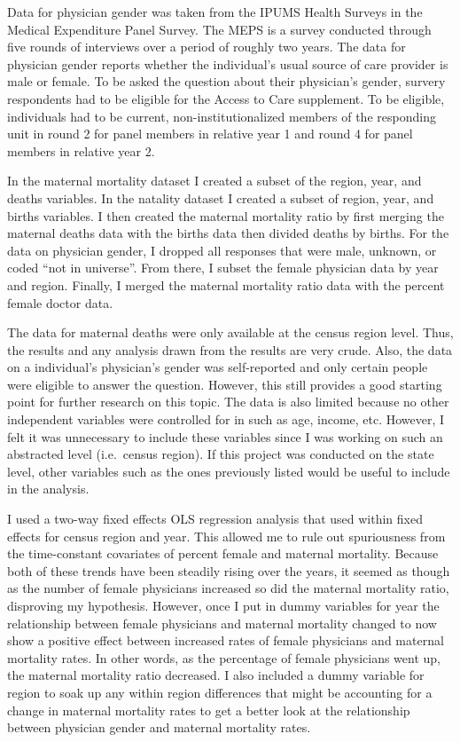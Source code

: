 \documentclass[11pt,]{article}
\begin{document}
Data for physician gender was taken from the IPUMS Health Surveys in the
Medical Expenditure Panel Survey. The MEPS is a survey conducted through
five rounds of interviews over a period of roughly two years. The data
for physician gender reports whether the individual's usual source of
care provider is male or female. To be asked the question about their
physician's gender, survery respondents had to be eligible for the
Access to Care supplement. To be eligible, individuals had to be
current, non-institutionalized members of the responding unit in round 2
for panel members in relative year 1 and round 4 for panel members in
relative year 2.

In the maternal mortality dataset I created a subset of the region,
year, and deaths variables. In the natality dataset I created a subset
of region, year, and births variables. I then created the maternal
mortality ratio by first merging the maternal deaths data with the
births data then divided deaths by births. For the data on physician
gender, I dropped all responses that were male, unknown, or coded ``not
in universe''. From there, I subset the female physician data by year
and region. Finally, I merged the maternal mortality ratio data with the
percent female doctor data.

The data for maternal deaths were only available at the census region
level. Thus, the results and any analysis drawn from the results are
very crude. Also, the data on a individual's physician's gender was
self-reported and only certain people were eligible to answer the
question. However, this still provides a good starting point for further
research on this topic. The data is also limited because no other
independent variables were controlled for in such as age, income, etc.
However, I felt it was unnecessary to include these variables since I
was working on such an abstracted level (i.e.~census region). If this
project was conducted on the state level, other variables such as the
ones previously listed would be useful to include in the analysis.

I used a two-way fixed effects OLS regression analysis that used within
fixed effects for census region and year. This allowed me to rule out
spuriousness from the time-constant covariates of percent female and
maternal mortality. Because both of these trends have been steadily
rising over the years, it seemed as though as the number of female
physicians increased so did the maternal mortality ratio, disproving my
hypothesis. However, once I put in dummy variables for year the
relationship between female physicians and maternal mortality changed to
now show a positive effect between increased rates of female physicians
and maternal mortality rates. In other words, as the percentage of
female physicians went up, the maternal mortality ratio decreased. I
also included a dummy variable for region to soak up any within region
differences that might be accounting for a change in maternal mortality
rates to get a better look at the relationship between physician gender
and maternal mortality rates.
\end{document}

